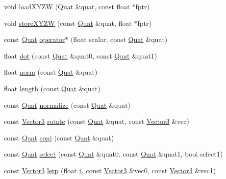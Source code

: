 \begin{DoxyCompactItemize}
\item 
void \hyperlink{namespaceVectormath_1_1Aos_a3a65ffa569e8543f573a80ba1a4b6dd3}{load\-X\-Y\-Z\-W} (\hyperlink{classVectormath_1_1Aos_1_1Quat}{Quat} \&quat, const float $\ast$fptr)
\item 
void \hyperlink{namespaceVectormath_1_1Aos_af15a22ee1eb0d7aa4e62efa747e03ea4}{store\-X\-Y\-Z\-W} (const \hyperlink{classVectormath_1_1Aos_1_1Quat}{Quat} \&quat, float $\ast$fptr)
\item 
const \hyperlink{classVectormath_1_1Aos_1_1Quat}{Quat} \hyperlink{namespaceVectormath_1_1Aos_ab174ecf17d9bb0a8fa3f87e7389d1158}{operator$\ast$} (float scalar, const \hyperlink{classVectormath_1_1Aos_1_1Quat}{Quat} \&quat)
\item 
float \hyperlink{namespaceVectormath_1_1Aos_ab29ffde5ae29fc1c6ef2022900656def}{dot} (const \hyperlink{classVectormath_1_1Aos_1_1Quat}{Quat} \&quat0, const \hyperlink{classVectormath_1_1Aos_1_1Quat}{Quat} \&quat1)
\item 
float \hyperlink{namespaceVectormath_1_1Aos_aabbbe84be2d8f739dd6009eda065b634}{norm} (const \hyperlink{classVectormath_1_1Aos_1_1Quat}{Quat} \&quat)
\item 
float \hyperlink{namespaceVectormath_1_1Aos_aa7db613f8732057fec0b26f26aefaff4}{length} (const \hyperlink{classVectormath_1_1Aos_1_1Quat}{Quat} \&quat)
\item 
const \hyperlink{classVectormath_1_1Aos_1_1Quat}{Quat} \hyperlink{namespaceVectormath_1_1Aos_aac46a6b9ec5fef7c62916fbb4a1b242f}{normalize} (const \hyperlink{classVectormath_1_1Aos_1_1Quat}{Quat} \&quat)
\item 
const \hyperlink{classVectormath_1_1Aos_1_1Vector3}{Vector3} \hyperlink{namespaceVectormath_1_1Aos_aec31ad770f5b950f6b518ee095dda7fa}{rotate} (const \hyperlink{classVectormath_1_1Aos_1_1Quat}{Quat} \&quat, const \hyperlink{classVectormath_1_1Aos_1_1Vector3}{Vector3} \&vec)
\item 
const \hyperlink{classVectormath_1_1Aos_1_1Quat}{Quat} \hyperlink{namespaceVectormath_1_1Aos_a6a104e48329108ed89d2e4278d6b27a8}{conj} (const \hyperlink{classVectormath_1_1Aos_1_1Quat}{Quat} \&quat)
\item 
const \hyperlink{classVectormath_1_1Aos_1_1Quat}{Quat} \hyperlink{namespaceVectormath_1_1Aos_afdb03c6b51541d403754ad1e68942e43}{select} (const \hyperlink{classVectormath_1_1Aos_1_1Quat}{Quat} \&quat0, const \hyperlink{classVectormath_1_1Aos_1_1Quat}{Quat} \&quat1, bool select1)
\item 
const \hyperlink{classVectormath_1_1Aos_1_1Vector3}{Vector3} \hyperlink{namespaceVectormath_1_1Aos_a579a9e213fdf9a3c672f4eaae04b009f}{lerp} (float \hyperlink{Main_8cpp_a0c8806dd40fb0525e1a3a2a5f78ef88d}{t}, const \hyperlink{classVectormath_1_1Aos_1_1Vector3}{Vector3} \&vec0, const \hyperlink{classVectormath_1_1Aos_1_1Vector3}{Vector3} \&vec1)

\end{DoxyCompactItemize}
